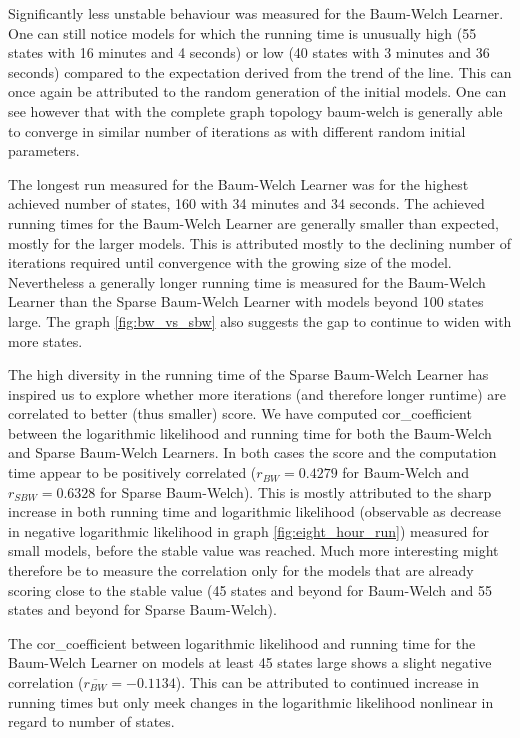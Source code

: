 Significantly less unstable behaviour was measured for the Baum-Welch Learner. One can still notice models for which the running time is unusually high (55 states with 16 minutes and 4 seconds) or low (40 states with 3 minutes and 36 seconds) compared to the expectation derived from the trend of the line. This can once again be attributed to the random generation of the initial models. One can see however that with the complete graph topology \gls{baum-welch} is generally able to converge in similar number of iterations as with different random initial parameters.

The longest run measured for the Baum-Welch Learner was for the highest achieved number of states, 160 with 34 minutes and 34 seconds. The achieved running times for the Baum-Welch Learner are generally smaller than expected, mostly for the larger models. This is attributed mostly to the declining number of iterations required until convergence with the growing size of the model. Nevertheless a generally longer running time is measured for the Baum-Welch Learner than the Sparse Baum-Welch Learner with models beyond 100 states large. The graph \ref{fig:bw_vs_sbw} also suggests the gap to continue to widen with more states.

The high diversity in the running time of the Sparse Baum-Welch Learner has inspired us to explore whether more iterations (and therefore longer runtime) are correlated to better (thus smaller) score. We have computed \gls{cor_coefficient} between the logarithmic likelihood and running time for both the Baum-Welch and Sparse Baum-Welch Learners. In both cases the score and the computation time appear to be positively correlated ($r_{BW} = 0.4279$ for Baum-Welch and $r_{SBW} = 0.6328$ for Sparse Baum-Welch). This is mostly attributed to the sharp increase in both running time and logarithmic likelihood (observable as decrease in negative logarithmic likelihood in graph \ref{fig:eight_hour_run}) measured for small models, before the stable value was reached. Much more interesting might therefore be to measure the correlation only for the models that are already scoring close to the stable value (45 states and beyond for Baum-Welch and 55 states and beyond for Sparse Baum-Welch).

The \gls{cor_coefficient} between logarithmic likelihood and running time for the Baum-Welch Learner on models at least 45 states large shows a slight negative correlation ($\overline{r_{BW}} = -0.1134$). This can be attributed to continued increase in running times but only meek changes in the logarithmic likelihood nonlinear in regard to number of states.

